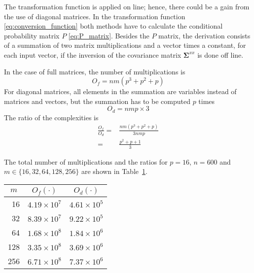 The transformation function is applied on line; hence, there could be a gain from the use of diagonal matrices. In the transformation function \eqref{eq:conversion_function} both methods have to calculate the conditional probability matrix $P$ \eqref{eq:P_matrix}. Besides the $P$ matrix, the derivation consists of a summation of two matrix multiplications and a vector times a constant, for each input vector, if the inversion of the covariance matrix $\mathbf{\Sigma}^{xx}$ is done off line. 

In the case of full matrices, the number of multiplications is
\begin{equation}
	O_f = nm(p^3 + p^2+p)
\end{equation}
For diagonal matrices, all elements in the summation are variables instead of matrices and vectors, but the summation has to be computed $p$ times
\begin{equation}
	O_d = nmp\times3
\end{equation}
The ratio of the complexities is
\begin{equation}
	\begin{split}
		\frac{O_f}{O_d} = & \frac{nm(p^3 + p^2+p)}{3nmp} \\
		= & \frac{p^2 + p+1}{3}
	\end{split}
\end{equation}

The total number of multiplications and the ratios for $p=16$, $n=600$ and $m\in \{16,32,64,128,256\}$ are shown in Table~\ref{tab:derivation_complexity}.
\begin{table}[ht]
	\begin{center}
		\begin{tabular}{rll}
			\toprule
			\multicolumn{1}{c}{$m$} & \multicolumn{1}{c}{$O_f(\cdot)$} & \multicolumn{1}{c}{$O_d(\cdot)$} \\
			\midrule
			16 & $4.19 \times 10^7$ & $4.61 \times 10^5$ \\
			32 & $8.39 \times 10^7$ & $9.22 \times 10^5$ \\
			64 & $1.68 \times 10^8$ & $1.84 \times 10^6$ \\
			128 & $3.35 \times 10^8$ & $3.69 \times 10^6$ \\
			256 & $6.71 \times 10^8$ & $7.37 \times 10^6$ \\
			\bottomrule			
		\end{tabular}		
	\end{center}
\label{tab:derivation_complexity}	
\end{table}

